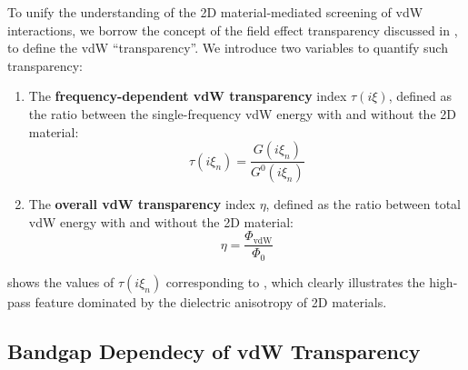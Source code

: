 To unify the understanding of the 2D material-mediated screening of
vdW interactions, we borrow the concept of the field effect
transparency  discussed in
, to define the vdW ``transparency''.
%
We introduce two variables to quantify such transparency:
\begin{enumerate}
\item The \textbf{frequency-dependent vdW transparency} index $\tau(i\xi)$,
  defined as the ratio between the single-frequency vdW energy with
  and without the 2D material:
  \begin{equation*}
  \label{eq:vdw-def-tau}
  \tau(i \xi_{n}) = \frac{G(i \xi_{n})}{G^{0}(i\xi_{n})}
\end{equation*}

\item The \textbf{overall vdW transparency} index $\eta$, defined as
  the ratio between total vdW energy with and without the 2D material:
  \begin{equation*}
\label{eq:vdw-def-total-trans}
\eta = \frac{\Phi_{\mathrm{vdW}}}{\Phi_{0}}
\end{equation*}
\end{enumerate}
%
 shows the values of $\tau(i \xi_{n})$
corresponding to , which clearly illustrates the
high-pass feature dominated by the dielectric anisotropy of 2D materials.

\subsection{Bandgap Dependecy of vdW Transparency}
\label{sec:bandg-depend-vdw}

